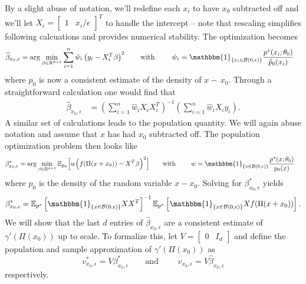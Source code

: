 \documentclass[11pt]{article}
\begin{document}
\noindent By a slight abuse of notation, we'll redefine each $x_i$ to have $x_0$ subtracted off and we'll let $X_i = \begin{bmatrix}
    1 & x_i/\epsilon
\end{bmatrix}^T$ to handle the intercept -- note that rescaling simplifies following calcuations and provides numerical stability. The optimization becomes 
\begin{align} 
\widehat{\beta}_{x_0,\epsilon} &= \arg\min_{\beta \in \mathbb{R}^{d+1}} \sum_{i = 1}^{n}\hat{w}_i\left(y_i - X_i^{T}\beta\right)^2 \qquad \text{with }\qquad \hat{w}_i = \mathbbm{1}_{\{x_i \in \mathcal{B}(0, \epsilon)\}}\frac{p^*(x_i;\theta_0)}{\hat{p}_0(x_i)}
\end{align}
where $\hat{p}_0$ is now a consistent estimate of the density of $x - \,x_0$. 
Through a straightforward calculation one would find that
\begin{align}
    \widehat{\beta}_{x_0,\epsilon} &= \left(\sum_{i = 1}^n\hat{w}_iX_iX_i^T\right)^{-1}\left(\sum_{i = 1}^n\hat{w}_iX_iy_i\right). \label{eq: sample est closed form}
\end{align}
A similar set of calculations leads to the population quantity. We will again abuse notation and assume that $x$ has had $x_0$ subtracted off. The population optimization problem then looks like
\begin{align}
\beta^*_{x_0, \epsilon} &= \arg\min_{\beta \in \mathbb{R}^{d+1}} \mathbb{E}_{p_0} \Big[w\Big(f(\Pi(x + x_0)) - X^{T}\beta \Big)^2\Big] \qquad \text{with }\qquad w = \mathbbm{1}_{\{x \in \mathcal{B}(0, \epsilon)\}}\frac{p^*(x;\theta_0)}{p_0(x)}\label{eq: population estimator}
\end{align}
where $p_0$ is the density of the random variable $x - x_0$. Solving for $\beta^*_{x_0, \epsilon}$ yields
\begin{align}
    \beta^*_{x_0, \epsilon} = \mathbb{E}_{p^*}\left[\mathbbm{1}_{\{x \in \mathcal{B}(0,\epsilon)\}}XX^T\right]^{-1}\mathbb{E}_{p^*}\left[\mathbbm{1}_{\{x \in \mathcal{B}(0,\epsilon)\}}Xf(\Pi(x+x_0))\right]. \label{eq: population estimator closed form}
\end{align}
We will show that the last $d$ entries of $\widehat{\beta}_{x_0,\epsilon}$ are a consistent estimate of $\gamma'(\Pi(x_0))$ up to scale. To formalize this, let $V = \begin{bmatrix} 0 & I_d\end{bmatrix}$ and define the population and sample approximation of $\gamma'(\Pi(x_0))$ as
\begin{equation}
    v^*_{x_0, \epsilon} = V\beta^*_{x_0, \epsilon} \qquad \text{and }\qquad \hat{v}_{x_0, \epsilon} = V\hat{\beta}_{x_0, \epsilon} \label{eq: velocity estimator}
\end{equation}
respectively.
\end{document}
